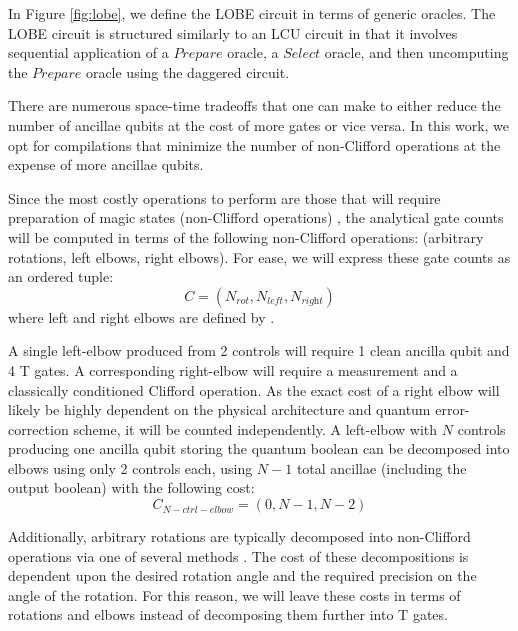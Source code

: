 In Figure \ref{fig:lobe}, we define the LOBE circuit in terms of generic oracles.
The LOBE circuit is structured similarly to an LCU circuit in that it involves sequential application of a $\textit{Prepare}$ oracle, a $\textit{Select}$ oracle, and then uncomputing the $\textit{Prepare}$ oracle using the daggered circuit.

There are numerous space-time tradeoffs that one can make to either reduce the number of ancillae qubits at the cost of more gates or vice versa.
In this work, we opt for compilations that minimize the number of non-Clifford operations at the expense of more ancillae qubits.

Since the most costly operations to perform are those that will require preparation of magic states (non-Clifford operations) , the analytical gate counts will be computed in terms of the following non-Clifford operations: (arbitrary rotations, left elbows, right elbows).
For ease, we will express these gate counts as an ordered tuple:
\begin{equation}
    \label{eq:gate-counts}
    C = (N_{\textit{rot}}, N_{\textit{left}}, N_{\textit{right}})
\end{equation}
where left and right elbows are defined by \cite{babbush2018encoding}.

A single left-elbow produced from 2 controls will require 1 clean ancilla qubit and 4 T gates. 
A corresponding right-elbow will require a measurement and a classically conditioned Clifford operation.
As the exact cost of a right elbow will likely be highly dependent on the physical architecture and quantum error-correction scheme, it will be counted independently.
A left-elbow with $N$ controls producing one ancilla qubit storing the quantum boolean can be decomposed into elbows using only 2 controls each, using $N-1$ total ancillae (including the output boolean) with the following cost:
\begin{equation}
    \label{eq:N-ctrl-elbow}
    C_{N-ctrl-elbow} = (0, N-1, N-2)
\end{equation}

Additionally, arbitrary rotations are typically decomposed into non-Clifford operations via one of several methods \cite{ross2014optimal, bocharov2015efficient} .
The cost of these decompositions is dependent upon the desired rotation angle and the required precision on the angle of the rotation.
For this reason, we will leave these costs in terms of rotations and elbows instead of decomposing them further into T gates.

